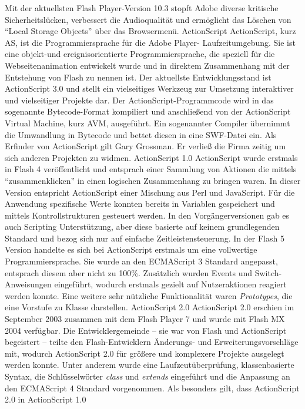 Mit der aktuellsten Flash Player-Version 10.3 stopft Adobe diverse kritische
Sicherheitslücken, verbessert die Audioqualität und ermöglicht das Löschen
von ``Local Storage Objects'' über das Browsermenü.
ActionScript
ActionScript, kurz AS, ist die Programmiersprache für die Adobe Player-
Laufzeitumgebung. Sie ist eine objekt-und ereignisorientierte
Programmiersprache, die speziell für die Webseitenanimation entwickelt wurde
und in direktem Zusammenhang mit der Entstehung von Flash zu nennen ist. Der
aktuellste Entwicklungsstand ist ActionScript 3.0 und stellt ein vielseitiges
Werkzeug zur Umsetzung interaktiver und vielseitiger Projekte dar.
Der ActionScript-Programmcode wird in das sogenannte Bytecode-Format kompiliert
und anschließend von der ActionScript Virtual Machine, kurz AVM, ausgeführt.
Ein sogenannter Compiler übernimmt die Umwandlung in Bytecode und bettet
diesen in eine SWF-Datei ein. Als Erfinder von ActionScript gilt Gary
Grossman. Er verließ die Firma zeitig um sich anderen Projekten zu widmen.
ActionScript 1.0
ActionScript wurde erstmals in Flash 4 veröffentlicht und entsprach einer
Sammlung von Aktionen die mittels "`zusammenklicken"' in einen logischen
Zusammenhang zu bringen waren. In dieser Version entspricht ActionScript
einer Mischung aus Perl und JavaScript. Für die Anwendung spezifische Werte
konnten bereits in Variablen gespeichert und mittels Kontrollstrukturen
gesteuert werden. In den Vorgängerversionen gab es auch Scripting
Unterstützung, aber diese basierte auf keinem grundlegenden Standard und
bezog sich nur auf einfache Zeitleistensteuerung. In der Flash 5 Version
handelte es sich bei ActionScript erstmals um eine vollwertige
Programmiersprache. Sie wurde an den ECMAScript 3 Standard angepasst, entsprach
diesem aber nicht zu 100\%. Zusätzlich wurden Events und Switch-Anweisungen
eingeführt, wodurch erstmals gezielt auf Nutzeraktionen reagiert werden konnte.
Eine weitere sehr nützliche Funktionalität waren \emph{Prototypes}, die eine
Vorstufe zu Klasse darstellen.
ActionScript 2.0
ActionScript 2.0 erschien im September 2003 zusammen mit dem Flash Player 7
und wurde mit Flash MX 2004 verfügbar. Die Entwicklergemeinde -- sie war von
Flash und ActionScript begeistert -- teilte den Flash-Entwicklern Änderungs-
und Erweiterungsvorschläge mit, wodurch ActionScript 2.0 für größere und
komplexere Projekte ausgelegt werden konnte. Unter anderem wurde eine
Laufzeutüberprüfung, klassenbasierte Syntax, die Schlüsselwörter \emph{class}
und \emph{extends} eingeführt und die Anpassung an den ECMAScript 4 Standard
vorgenommen. Als besonders gilt, dass ActionScript 2.0 in ActionScript 1.0
